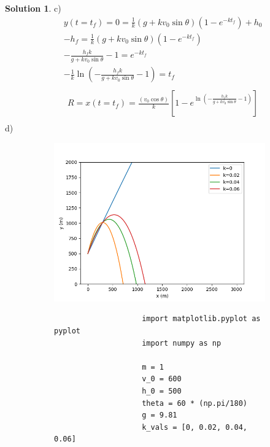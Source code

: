 \documentclass[10pt]{article}
\theoremstyle{definition}
\newtheorem{soln}{Solution}
\begin{document}
\begin{soln}
     c) \begin{align*}
           & y(t=t_f)=0=\frac{1}{k}(g+kv_0\sin\theta)(1-e^{-kt_f}) + h_0 \\
           & -h_f=\frac{1}{k}(g+kv_0\sin\theta)(1-e^{-kt_f})             \\
           & -\frac{h_fk}{g+kv_0\sin\theta}-1=e^{-kt_f}                  \\
           & -\frac{1}{k}\ln(-\frac{h_fk}{g+kv_0\sin\theta}-1)=t_f       \\
     \end{align*}
     \begin{align*}
           & R=x(t=t_f)=\frac{(v_0\cos\theta)}{k}\left[1-e^{\ln(-\frac{h_fk}{g+kv_0\sin\theta}-1)}\right] \\
     \end{align*}
     d) \\
     \begin{figure}[h]
          \begin{subfigure}[t]{0.49\textwidth}
               \vspace{-27pt}
               \includegraphics[width=\textwidth]{Figure_2.png}
          \end{subfigure}\hfill
          \begin{subfigure}[t]{0.49\textwidth}
               \begin{verbatim}
                    import matplotlib.pyplot as pyplot
                    import numpy as np

                    m = 1
                    v_0 = 600
                    h_0 = 500
                    theta = 60 * (np.pi/180)
                    g = 9.81
                    k_vals = [0, 0.02, 0.04, 0.06]


\end{verbatim}
\end{subfigure}
\end{figure}
\end{soln}
\end{document}
